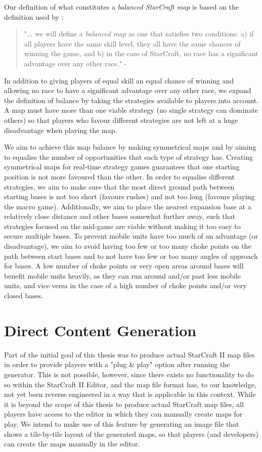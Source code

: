 Our definition of what constitutes a \textit{balanced StarCraft map} is based on the definition used by \citeauthor{uriarte2013psmage}\cite{uriarte2013psmage}:
\begin{quote}
	"... we will define a \textit{balanced map} as one that satisfies two conditions: a) if all players have the same skill level, they all have the same chances of winning the game, and b) in the case of StarCraft, no race has a significant advantage over any other race." - \citeauthor{uriarte2013psmage}\cite{uriarte2013psmage}
\end{quote}

In addition to giving players of equal skill an equal chance of winning and allowing no race to have a significant advantage over any other race, we expand the definition of balance by taking the strategies available to players into account. A map must have more than one viable strategy (no single strategy can dominate others) so that players who favour different strategies are not left at a huge disadvantage when playing the map. 

We aim to achieve this map balance by making symmetrical maps and by aiming to equalise the number of opportunities that each type of strategy has. Creating symmetrical maps for real-time strategy games guarantees that one starting position is not more favoured than the other. In order to equalise different strategies, we aim to make sure that the most direct ground path between starting bases is not too short (favours rushes) and not too long (favours playing the macro game). Additionally, we aim to place the nearest expansion base at a relatively close distance and other bases somewhat further away, such that strategies focused on the mid-game are viable without making it too easy to secure multiple bases. To prevent mobile units have too much of an advantage (or disadvantage), we aim to avoid having too few or too many choke points on the path between start bases and to not have too few or too many angles of approach for bases. A low number of choke points or very open areas around bases will benefit mobile units heavily, as they can run around and/or past less mobile units, and vice versa in the case of a high number of choke points and/or very closed bases.

\section{Direct Content Generation}
\label{goals_representation}
Part of the initial goal of this thesis was to produce actual StarCraft II map files in order to provide players with a "plug \& play" option after running the generator. This is not possible, however, since there exists no functionality to do so within the StarCraft II Editor, and the map file format has, to our knowledge, not yet been reverse engineered in a way that is applicable in this context. While it is beyond the scope of this thesis to produce actual StarCraft map files, all players have access to the editor in which they can manually create maps for play. We intend to make use of this feature by generating an image file that shows a tile-by-tile layout of the generated maps, so that players (and developers) can create the maps manually in the editor.

